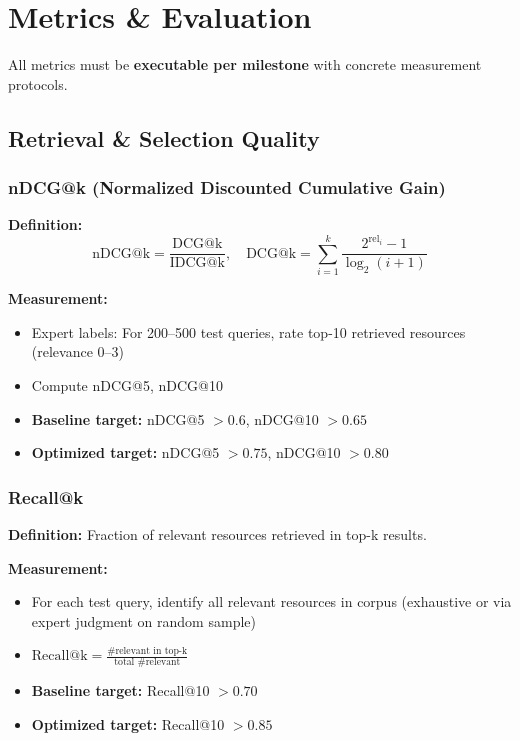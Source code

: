\documentclass[11pt,letterpaper]{article}
\begin{document}
\newpage

\section{Metrics \& Evaluation}

All metrics must be \textbf{executable per milestone} with concrete measurement protocols.

\subsection{Retrieval \& Selection Quality}

\subsubsection{nDCG@k (Normalized Discounted Cumulative Gain)}

\textbf{Definition:}
\[
\text{nDCG@k} = \frac{\text{DCG@k}}{\text{IDCG@k}}, \quad \text{DCG@k} = \sum_{i=1}^{k} \frac{2^{\text{rel}_i} - 1}{\log_2(i+1)}
\]

\textbf{Measurement:}
\begin{itemize}
\item Expert labels: For 200--500 test queries, rate top-10 retrieved resources (relevance 0--3)
\item Compute nDCG@5, nDCG@10
\item \textbf{Baseline target:} nDCG@5 $> 0.6$, nDCG@10 $> 0.65$
\item \textbf{Optimized target:} nDCG@5 $> 0.75$, nDCG@10 $> 0.80$
\end{itemize}

\subsubsection{Recall@k}

\textbf{Definition:} Fraction of relevant resources retrieved in top-k results.

\textbf{Measurement:}
\begin{itemize}
\item For each test query, identify all relevant resources in corpus (exhaustive or via expert judgment on random sample)
\item $\text{Recall@k} = \frac{\text{\# relevant in top-k}}{\text{total \# relevant}}$
\item \textbf{Baseline target:} Recall@10 $> 0.70$
\item \textbf{Optimized target:} Recall@10 $> 0.85$
\end{itemize}
\end{document}
